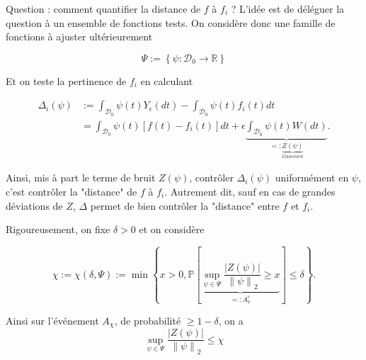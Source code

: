 \documentclass[11pt,letterpaper]{article}
\begin{document}
\par Question : comment quantifier la distance de $f$ à $f_i$ ? L'idée est de déléguer la question à un ensemble de fonctions tests. On considère donc une famille de fonctions à ajuster ultérieurement

\begin{equation}
\Psi := \left\lbrace \psi : \mathcal{D}_0 \to \mathbb{R} \right\rbrace
\end{equation}

\par Et on teste la pertinence de $f_i$ en calculant

\begin{equation}
	\begin{split}
		\Delta_i \left( \psi \right) & := \int_{\mathcal{D}_0}^{} \psi \left( t \right) Y_\epsilon \left( dt \right) - \int_{\mathcal{D}_0}^{} \psi \left( t \right) f_i \left( t \right) dt \\
		&= \int_{\mathcal{D}_0}^{} \psi \left( t \right) \left[ f \left( t \right) - f_i \left( t \right) \right] dt + \epsilon \underbrace{\int_{\mathcal{D}_0}^{} \psi \left( t \right) W \left( dt \right)}_{=: \underbrace{Z \left( \psi \right)}_{Gaussien}} .
	\end{split}
\end{equation}

\par Ainsi, mis à part le terme de bruit $Z \left( \psi \right)$, contrôler $\Delta_i \left( \psi \right)$ uniformément en $\psi$, c'est contrôler la "distance" de $f$ à $f_i$. Autrement dit, sauf en cas de grandes déviations de $Z$, $\Delta$ permet de bien contrôler la "distance" entre $f$ et $f_i$.

\par Rigoureusement, on fixe $\delta > 0$ et on considère

\begin{equation}
\chi := \chi \left( \delta, \Psi \right) := \min \left\lbrace x > 0, \mathbb{P} \left[ \underbrace{ \sup\limits_{\psi \in \Psi} \frac{\left| Z \left( \psi \right) \right|}{\left\| \psi \right\|_2} \geq x }_{=: A_x^c} \right] \leq \delta \right\rbrace .
\end{equation}

\par Ainsi sur l'événement $A_\chi$, de probabilité $\geq 1 - \delta$, on a
\begin{equation}
\sup\limits_{\psi \in \Psi} \frac{\left| Z \left( \psi \right) \right|}{\left\| \psi \right\|_2} \leq \chi 
\end{equation}
\end{document}

